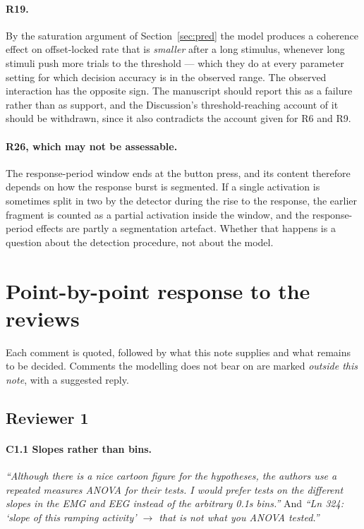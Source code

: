 \documentclass[a4paper,11pt]{article}
\newcommand{\1}{\mathbbm{1}}
\begin{document}
\paragraph{R19.} By the saturation argument of Section~\ref{sec:pred} the model produces a coherence effect on
offset-locked rate that is \emph{smaller} after a long stimulus, whenever long
stimuli push more trials to the threshold --- which they do at every parameter
setting for which decision accuracy is in the observed range. The observed
interaction has the opposite sign. The manuscript should report this as a failure
rather than as support, and the Discussion's threshold-reaching account of it should
be withdrawn, since it also contradicts the account given for R6 and R9.

\paragraph{R26, which may not be assessable.} The response-period window ends
at the button press, and its content therefore depends on how the response burst is
segmented. If a single activation is sometimes split in two by the detector during
the rise to the response, the earlier fragment is counted as a partial activation
inside the window, and the response-period effects are partly a segmentation artefact.
Whether that happens is a question about the detection procedure, not about the model.

\section{Point-by-point response to the reviews}
\label{sec:responses}

Each comment is quoted, followed by what this note supplies and what remains to be
decided. Comments the modelling does not bear on are marked \emph{outside this note},
with a suggested reply.

\subsection{Reviewer 1}

\paragraph{C1.1 Slopes rather than bins.}
\emph{``Although there is a nice cartoon figure for the hypotheses, the authors use a
repeated measures ANOVA for their tests. I would prefer tests on the different slopes
in the EMG and EEG instead of the arbitrary 0.1s bins.''} And \emph{``Ln 324: `slope of
this ramping activity' $\rightarrow$ that is not what you ANOVA tested.''}
\end{document}
